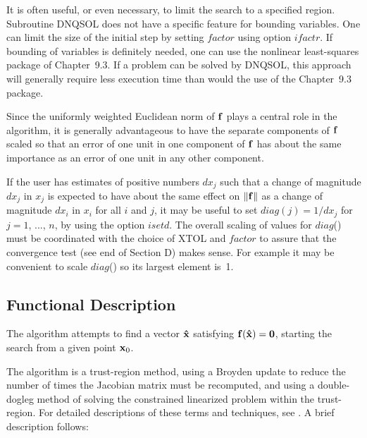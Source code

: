 \documentclass[twoside]{MATH77}
\begin{document}
It is often useful, or even necessary, to limit the search to a specified
region. Subroutine DNQSOL does not have a specific feature for bounding
variables. One can limit the size of the initial step by setting $factor$
using option $ifactr$. If bounding of variables is definitely needed, one can
use the nonlinear least-squares package of Chapter~9.3. If a problem can be
solved by DNQSOL, this approach will generally require less execution time
than would the use of the Chapter~9.3 package.

Since the uniformly weighted Euclidean norm of ${\bf f}$ plays a central
role in the algorithm, it is generally advantageous to have the separate
components of ${\bf f}$ scaled so that an error of one unit in one component
of ${\bf f}$ has about the same importance as an error of one unit in any
other component.

If the user has estimates of positive numbers $dx_j$ such that a change of
magnitude $dx_j$ in $x_j$ is expected to have about the same effect on $\|%
{\bf f}\| $ as a change of magnitude $dx_i$ in $x_i$ for all $i$ and $j$, it
may be useful to set $diag(j) = 1/dx_j$ for $j = 1$, ..., $n$, by using the
option $isetd$. The overall scaling of values for $diag$() must be coordinated
with the choice of XTOL and $factor$ to assure that the convergence test (see
end of Section D) makes sense. For example it may be convenient to scale
$diag$() so its largest element is~1.

\subsection{Functional Description}

The algorithm attempts to find a vector ${\bf \hat x}$ satisfying ${\bf f}(%
{\bf \hat x})={\bf 0}$, starting the search from a given point ${\bf x}_0$.

The algorithm is a trust-region method, using a Broyden update to reduce the
number of times the Jacobian matrix must be recomputed, and using a
double-dogleg method of solving the constrained linearized problem within
the trust-region. For detailed descriptions of these terms and techniques,
see \cite{Dennis:1983:NMU}. A brief description follows:
\end{document}
